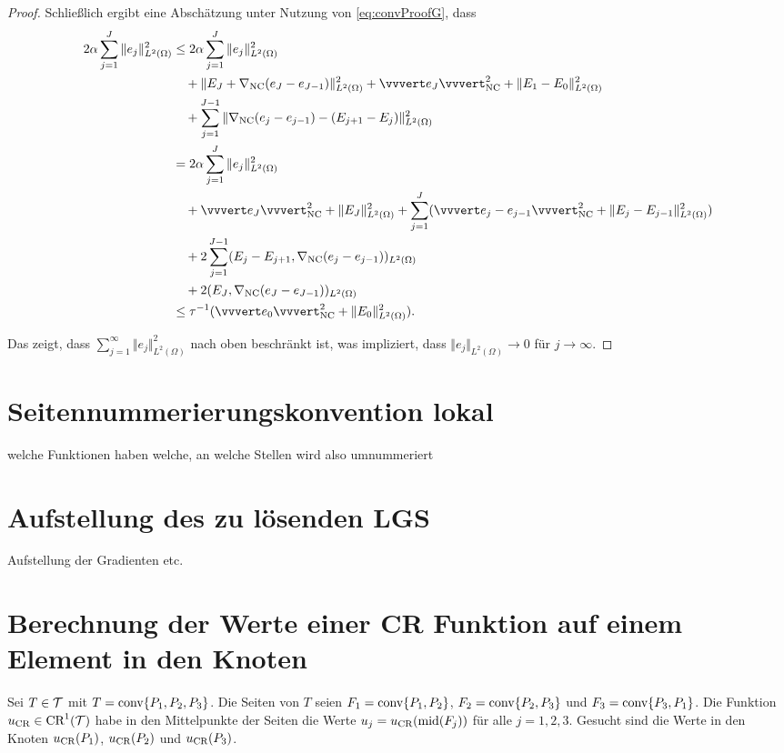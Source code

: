 \begin{proof}
  Schließlich ergibt eine Abschätzung unter Nutzung von \eqref{eq:convProofG}, 
  dass
  \begin{align*}
    2\alpha\sum_{j=1}^J\Vert e_j\Vert^2_{L^2(\Omega)} 
    &\leq
    2\alpha\sum_{j=1}^J\Vert e_j\Vert^2_{L^2(\Omega)}\\
    &\quad
    +\Vert E_J + \gradnc(e_J-e_{J-1}) \Vert_{L^2(\Omega)}^2 
    + \vvvert e_J \vvvert^2_\nc 
    + \Vert E_1 - E_0 \Vert^2_{L^2(\Omega)} \\
    &\quad 
    + \sum_{j=1}^{J-1}  
      \Vert \gradnc(e_j-e_{j-1}) - (E_{j+1} - E_j ) \Vert^2_{L^2(\Omega)} \\
    & = 
    2\alpha\sum_{j=1}^J\Vert e_j\Vert^2_{L^2(\Omega)}\\
    &\quad 
    +\vvvert e_J \vvvert^2_\nc + \Vert E_J \Vert_{L^2(\Omega)}^2 
    + \sum_{j=1}^J ( \vvvert e_j-e_{j-1} \vvvert^2_\nc
    + \Vert E_j - E_{j-1} \Vert^2_{L^2(\Omega)} )\\
    &\quad
    + 2\sum_{j=1}^{J-1}(E_j-E_{j+1},\gradnc(e_j-e_{j-1}))_{L^2(\Omega)}\\
    &\quad 
    + 2(E_{J},\gradnc(e_J-e_{J-1}))_{L^2(\Omega)} \\
    &\leq
    \tau^{-1}(\vvvert e_0\vvvert^2_\nc + \Vert E_0\Vert^2_{L^2(\Omega)}).
  \end{align*}

  Das zeigt, dass
  $\sum_{j=1}^\infty \Vert e_j\Vert _{L^2(\Omega)}^2$ nach oben beschränkt ist,
  was impliziert, dass $\Vert e_j\Vert_{L^2(\Omega)}\rightarrow 0$
  für $j\rightarrow \infty$.
\end{proof}


\section{Seitennummerierungskonvention lokal}
welche Funktionen haben welche, an 
welche Stellen wird also umnummeriert

\section{Aufstellung des zu lösenden LGS}
Aufstellung der Gradienten etc.
 
\section{Berechnung der Werte einer CR Funktion auf einem Element in den Knoten}
Sei $T\in\mathcal{T}$ mit $T = \textup{conv}\{P_1, P_2, P_3\}$. Die Seiten 
von $T$ seien $F_1 = \textup{conv}\{P_1,P_2\}$, $F_2 = \textup{conv}\{P_2,P_3\}$ und $F_3 =
\textup{conv}\{P_3,P_1\}$. Die Funktion
$u_\textup{CR}\in\textup{CR}^1(\mathcal{T})$ habe in den Mittelpunkte der Seiten die Werte $u_j =
u_\textup{CR}(\textup{mid}(F_j))$ für alle $j=1,2,3$. Gesucht sind die Werte in den Knoten
$u_\textup{CR}(P_1)$, $u_\textup{CR}(P_2)$ und $u_\textup{CR}(P_3)$.

